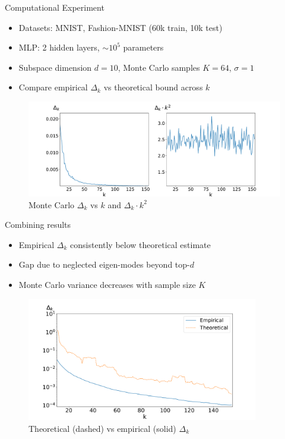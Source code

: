 \documentclass{beamer}
\begin{document}
\begin{frame}{Computational Experiment}
    \begin{itemize}
        \item Datasets: MNIST, Fashion-MNIST (60k train, 10k test)
        \item MLP: 2 hidden layers, $\sim 10^5$ parameters
        \item Subspace dimension $d=10$, Monte Carlo samples $K=64$, $\sigma=1$
        \item Compare empirical $\Delta_k$ vs theoretical bound across $k$
    \end{itemize}

    \begin{figure}
        \centering
        \includegraphics[width=1.05\textwidth,trim=0 17 0 1.5cm,clip]{img/delta_eigen_1_10_1024.pdf}
        \caption*{Monte Carlo $\Delta_k$ vs $k$ and $\Delta_k\cdot k^2$}
    \end{figure}
\end{frame}

\begin{frame}{Combining results}
    \begin{itemize}
        \item Empirical $\Delta_k$ consistently below theoretical estimate
        \item Gap due to neglected eigen-modes beyond top-$d$
        \item Monte Carlo variance decreases with sample size $K$
    \end{itemize}

    \begin{figure}
        \centering
        \includegraphics[width=0.9\textwidth]{img/delta_border_1_10_1024.pdf}
        \caption*{Theoretical (dashed) vs empirical (solid) $\Delta_k$}
    \end{figure}
\end{frame}
\end{document}
